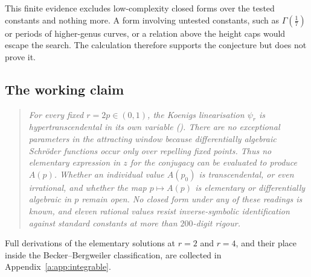This finite evidence excludes low-complexity closed forms over the tested constants
and nothing more.  A form involving untested constants, such as
$\Gamma(\tfrac17)$ or periods of higher-genus curves, or a relation above the
height caps would escape the search.  The calculation therefore supports the
conjecture but does not prove it.

\subsection{The working claim}

\begin{quote}
\textit{For every fixed $r=2p\in(0,1)$, the Koenigs linearisation $\psi_r$ is
hypertranscendental in its own variable ().  There are no
exceptional parameters in the attracting window because differentially algebraic
Schr\"oder functions occur only over repelling fixed points.  Thus no elementary
expression in $z$ for the conjugacy can be evaluated to produce $A(p)$.  Whether
an individual value $A(p_0)$ is transcendental, or even irrational, and whether
the map $p\mapsto A(p)$ is elementary or differentially algebraic in $p$ remain
open.  No closed form under any of these readings is known, and eleven rational
values resist inverse-symbolic identification against standard constants at more
than $200$-digit rigour.}
\end{quote}

Full derivations of the elementary solutions at $r=2$ and $r=4$, and their place inside the Becker--Bergweiler classification, are collected in Appendix~\ref{a:app:integrable}.
